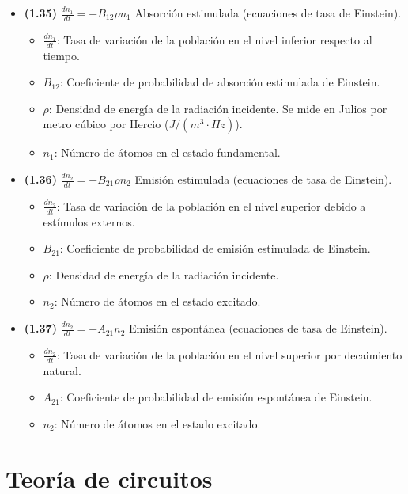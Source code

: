 \documentclass{article}
\begin{document}
\begin{itemize}
				\item \textbf{(1.35)} $\boxed{\frac{dn_{1}}{dt}=-B_{12}\rho n_{1}}$ Absorción estimulada (ecuaciones de tasa de Einstein).
					\begin{itemize}
						\item $\frac{dn_1}{dt}$: Tasa de variación de la población en el nivel inferior respecto al tiempo.
						\item $B_{12}$: Coeficiente de probabilidad de absorción estimulada de Einstein.
						\item $\rho$: Densidad de energía de la radiación incidente. Se mide en Julios por metro cúbico por Hercio ($J/(m^3\cdot Hz)$).
						\item $n_1$: Número de átomos en el estado fundamental.
					\end{itemize}

				\item \textbf{(1.36)} $\boxed{\frac{dn_{2}}{dt}=-B_{21}\rho n_{2}}$ Emisión estimulada (ecuaciones de tasa de Einstein).
					\begin{itemize}
						\item $\frac{dn_2}{dt}$: Tasa de variación de la población en el nivel superior debido a estímulos externos.
						\item $B_{21}$: Coeficiente de probabilidad de emisión estimulada de Einstein.
						\item $\rho$: Densidad de energía de la radiación incidente.
						\item $n_2$: Número de átomos en el estado excitado.
					\end{itemize}

				\item \textbf{(1.37)} $\boxed{\frac{dn_{2}}{dt}=-A_{21}n_{2}}$ Emisión espontánea (ecuaciones de tasa de Einstein).
					\begin{itemize}
						\item $\frac{dn_2}{dt}$: Tasa de variación de la población en el nivel superior por decaimiento natural.
						\item $A_{21}$: Coeficiente de probabilidad de emisión espontánea de Einstein.
						\item $n_2$: Número de átomos en el estado excitado.
					\end{itemize}
			\end{itemize}

	\section{Teoría de circuitos}
\end{document}
